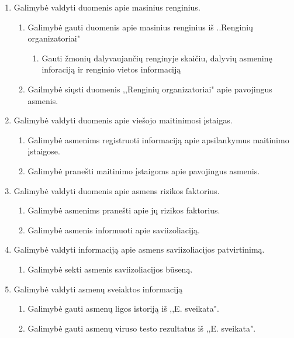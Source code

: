 \documentclass{VUMIFPSkursinis}
\begin{document}
\begin{enumerate}
\begin{enumerate}
\begin{enumerate}
					\end{enumerate}
			\end{enumerate}
		\item{Galimybė valdyti duomenis apie masinius renginius.}
			\begin{enumerate}
				\item{Galimybė gauti duomenis apie masinius renginius iš ..Renginių organizatoriai"}
					\begin{enumerate}
						\item{Gauti žmonių dalyvaujančių renginyje skaičiu, dalyvių asmeninę inforaciją ir renginio vietos informaciją}
					\end{enumerate}
				\item{Gailmybė siųsti duomenis ,,Renginių organizatoriai" apie pavojingus asmenis.}
			\end{enumerate}
		\item{Galimybė valdyti duomenis apie viešojo maitinimosi įstaigas.}
			\begin{enumerate}
				\item{Galimybė asmenims registruoti informaciją apie apsilankymus maitinimo įstaigose.}
				\item{Galimybė pranešti maitinimo įstaigoms apie pavojingus asmenis.}
			\end{enumerate}
		\item{Galimybė valdyti duomenis apie asmens rizikos faktorius.}
			\begin{enumerate}
				\item{Galimybė asmenims pranešti apie jų rizikos faktorius.}
				\item{Galimybė asmenis informuoti apie saviizoliaciją.}
			\end{enumerate}
		\item{Galimybė valdyti informaciją apie asmens saviizoliacijos patvirtinimą.}
			\begin{enumerate}
				\item{Galimybė sekti asmenis saviizoliacijos būseną.}
			\end{enumerate}
		\item{Galimybė valdyti asmenų sveiaktos informaciją}
			\begin{enumerate}
				\item{Galimybė gauti asmenų ligos istoriją iš ,,E. sveikata".}
				\item{Galimybė gauti asmenų viruso testo rezultatus iš ,,E. sveikata".}
			\end{enumerate}
	\end{enumerate}
\end{document}
